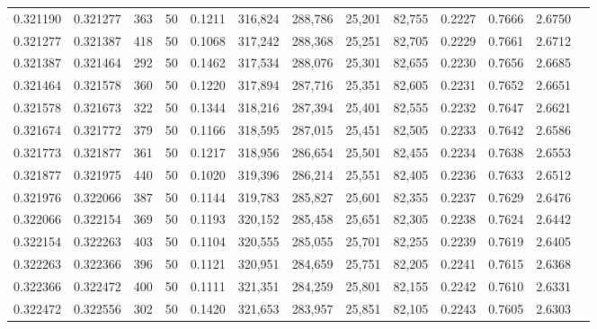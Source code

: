 \begin{tabular}{rrrrrrrrrrrrr}
0.321190 & 0.321277 &   363 &  50 &                                     0.1211 & 316,824 & 288,786 &  25,201 &  82,755 & 0.2227 & 0.7666 & 2.6750 \\
0.321277 & 0.321387 &   418 &  50 &                                     0.1068 & 317,242 & 288,368 &  25,251 &  82,705 & 0.2229 & 0.7661 & 2.6712 \\
0.321387 & 0.321464 &   292 &  50 &                                     0.1462 & 317,534 & 288,076 &  25,301 &  82,655 & 0.2230 & 0.7656 & 2.6685 \\
0.321464 & 0.321578 &   360 &  50 &                                     0.1220 & 317,894 & 287,716 &  25,351 &  82,605 & 0.2231 & 0.7652 & 2.6651 \\
0.321578 & 0.321673 &   322 &  50 &                                     0.1344 & 318,216 & 287,394 &  25,401 &  82,555 & 0.2232 & 0.7647 & 2.6621 \\
0.321674 & 0.321772 &   379 &  50 &                                     0.1166 & 318,595 & 287,015 &  25,451 &  82,505 & 0.2233 & 0.7642 & 2.6586 \\
0.321773 & 0.321877 &   361 &  50 &                                     0.1217 & 318,956 & 286,654 &  25,501 &  82,455 & 0.2234 & 0.7638 & 2.6553 \\
0.321877 & 0.321975 &   440 &  50 &                                     0.1020 & 319,396 & 286,214 &  25,551 &  82,405 & 0.2236 & 0.7633 & 2.6512 \\
0.321976 & 0.322066 &   387 &  50 &                                     0.1144 & 319,783 & 285,827 &  25,601 &  82,355 & 0.2237 & 0.7629 & 2.6476 \\
0.322066 & 0.322154 &   369 &  50 &                                     0.1193 & 320,152 & 285,458 &  25,651 &  82,305 & 0.2238 & 0.7624 & 2.6442 \\
0.322154 & 0.322263 &   403 &  50 &                                     0.1104 & 320,555 & 285,055 &  25,701 &  82,255 & 0.2239 & 0.7619 & 2.6405 \\
0.322263 & 0.322366 &   396 &  50 &                                     0.1121 & 320,951 & 284,659 &  25,751 &  82,205 & 0.2241 & 0.7615 & 2.6368 \\
0.322366 & 0.322472 &   400 &  50 &                                     0.1111 & 321,351 & 284,259 &  25,801 &  82,155 & 0.2242 & 0.7610 & 2.6331 \\
0.322472 & 0.322556 &   302 &  50 &                                     0.1420 & 321,653 & 283,957 &  25,851 &  82,105 & 0.2243 & 0.7605 & 2.6303 \\

\end{tabular}
